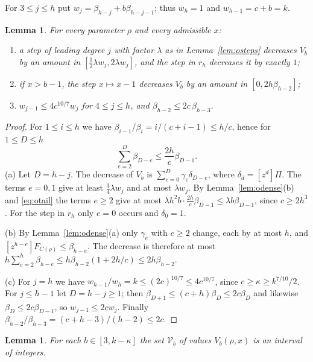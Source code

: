 \documentclass[11pt]{amsart}
\newtheorem{lemma}[theorem]{Lemma}
\theoremstyle{definition}
\theoremstyle{remark}
\numberwithin{equation}{section}
\newcommand{\coef}[1]{[z^{#1}]}
\begin{document}
For $3\le j\le h$ put $w_j=\beta_{h-j}+b\beta_{h-j-1}$; thus $w_h=1$ and $w_{h-1}=c+b=k$.

\begin{lemma}\label{lem:oweights}
For every parameter $\rho$ and every admissible $x$:
\begin{enumerate}[label=\textup{(\alph*)}]
\item a step of leading degree $j$ with factor $\lambda$ as in Lemma~\ref{lem:osteps} decreases $V_b$ by an amount in $[\frac12\lambda w_j,2\lambda w_j]$, and the step in $r_h$ decreases it by exactly $1$;
\item if $x>b-1$, the step $x\mapsto x-1$ decreases $V_b$ by an amount in $[0,2h\beta_{h-2}]$;
\item $w_{j-1}\le 4c^{10/7}w_j$ for $4\le j\le h$, and $\beta_{h-2}\le 2c\,\beta_{h-3}$.
\end{enumerate}
\end{lemma}

\begin{proof}
For $1\le i\le h$ we have $\beta_{i-1}/\beta_i=i/(c+i-1)\le h/c$, hence for $1\le D\le h$
\begin{equation}\label{eq:otail}
\sum_{e=2}^D\beta_{D-e}\le\frac{2h}{c}\beta_{D-1}.
\end{equation}
(a) Let $D=h-j$. The decrease of $V_b$ is $\sum_{e=0}^D\gamma_e\delta_{D-e}$, where $\delta_d=\coef d\Pi$. The terms $e=0,1$ give at least $\frac34\lambda w_j$ and at most $\lambda w_j$. By Lemma~\ref{lem:odense}(b) and \eqref{eq:otail} the terms $e\ge2$ give at most $\lambda h^2b\cdot\frac{2h}c\beta_{D-1}\le\lambda b\beta_{D-1}$, since $c\ge 2h^3$. For the step in $r_h$ only $e=0$ occurs and $\delta_0=1$.

(b) By Lemma~\ref{lem:odense}(a) only $\gamma_e$ with $e\ge 2$ change, each by at most $h$, and $\coef{h-e}F_{C(\rho)}\le\beta_{h-e}$. The decrease is therefore at most $h\sum_{e=2}^h\beta_{h-e}\le h\beta_{h-2}(1+2h/c)\le 2h\beta_{h-2}$.

(c) For $j=h$ we have $w_{h-1}/w_h=k\le(2c)^{10/7}\le 4c^{10/7}$, since $c\ge\kappa\ge k^{7/10}/2$. For $j\le h-1$ let $D=h-j\ge1$; then $\beta_{D+1}\le(c+h)\beta_D\le 2c\beta_D$ and likewise $\beta_D\le 2c\beta_{D-1}$, so $w_{j-1}\le 2cw_j$. Finally $\beta_{h-2}/\beta_{h-3}=(c+h-3)/(h-2)\le 2c$.
\end{proof}

\begin{lemma}\label{lem:obox}
For each $b\in[3,k-\kappa]$ the set $\mathcal V_b$ of values $V_b(\rho,x)$ is an interval of integers.
\end{lemma}
\end{document}
